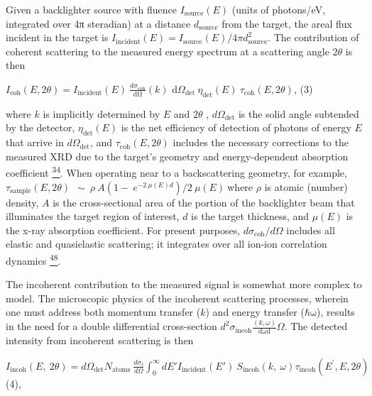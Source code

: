 Given a backlighter source with fluence
\(I_{\text{source}}\left( E \right)\) (units of photons/eV, integrated
over 4π steradian) at a distance \(d_{\text{source}}\) from the target,
the areal flux incident in the target is
\(I_{\text{incident}}\left( E \right) = I_{\text{source}}\left( E \right)/4\pi d_{\text{source}}^{2}\).
The contribution of coherent scattering to the measured energy spectrum
at a scattering angle \(2\theta\) is then

\(I_{\text{coh}}\left( E,2\theta \right) = I_{\text{incident}}\left( E \right)\ \frac{d\sigma_{\text{coh}}}{\text{dΩ}}\left( k \right)\text{\ d}\Omega_{\det}\ \eta_{\det}\left( E \right)\ \tau_{\text{coh}}\left( E,2\theta \right)\),
(3)

where \(k\) is implicitly determined by \(E\) and \(2\theta\) ,
\(d\Omega_{\det}\) is the solid angle subtended by the detector,
\(\eta_{\det}\left( E \right)\) is the net efficiency of detection of
photons of energy \(E\) that arrive in \(d\Omega_{\det}\), and
\(\tau_{\text{coh}}\left( E,2\theta \right)\) includes the necessary
corrections to the measured XRD due to the target's geometry and
energy-dependent absorption coefficient
\hyperref[j.-l.-bourgade-et-al.-review-of-scientific-instruments-75-4204-2004.]{\textsuperscript{34}}.
When operating near to a backscattering geometry, for example,
\(\tau_{\text{sample}}\left( E,2\theta \right)\ \ \sim\ \rho\ A(1 - \ e^{- 2\ \mu\left( E \right)d})/2\ \mu(E)\ \)where
\(\rho\) is atomic (number) density, \(A\) is the cross-sectional area
of the portion of the backlighter beam that illuminates the target
region of interest, \(d\) is the target thickness, and
\(\mu\left( E \right)\) is the x-ray absorption coefficient. For present
purposes, \(d\sigma_{\text{coh}}/d\Omega\) includes all elastic and
quasielastic scattering; it integrates over all ion-ion correlation
dynamics
\hyperref[g.-gregori-and-d.-o.-gericke-physics-of-plasmas-16-056306-2009.]{\textsuperscript{48}}.

The incoherent contribution to the measured signal is somewhat more
complex to model. The microscopic physics of the incoherent scattering
processes, wherein one must address both momentum transfer (\(k\)) and
energy transfer (\(\text{ℏω}\)), results in the need for a double
differential cross-section
\(d^{2}\sigma_{\text{incoh}}\frac{\left( k,\omega \right)}{\text{dωd}}\Omega\).
The detected intensity from incoherent scattering is then

\(I_{\text{incoh}}\left( E,\ 2\theta \right) = d\Omega_{\det}N_{\text{atoms}}\ \frac{d\sigma_{t}}{d\Omega}\int_{0}^{\infty}{dE'I_{\text{incident}}\left( E' \right)}\ S_{\text{incoh}}\left( k,\ \omega \right)\tau_{\text{incoh}}\left( E^{'},E,2\theta \right)\)
(4),

